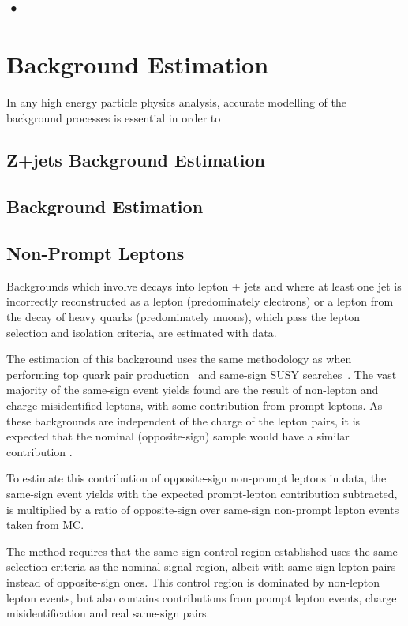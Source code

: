 \subsection{•}
\section{Background Estimation}\label{sec:bkgEst}
In any high energy particle physics analysis, accurate modelling of the background processes is essential in order to 
\subsection{Z+jets Background Estimation}\label{subsec:zPlusJets}

\subsection{\ttbar Background Estimation}\label{subsec:ttbar}

\subsection{Non-Prompt Leptons}\label{subsec:NPLs}
Backgrounds which involve decays into lepton + jets and where at least one jet is incorrectly reconstructed as a lepton (predominately electrons) or a lepton from the decay of heavy quarks (predominately muons), which pass the lepton selection and isolation criteria, are estimated with data.

The estimation of this background uses the same methodology as when performing top quark pair production~\cite{CMS:2016syx} and same-sign SUSY searches~\cite{CMS:2015vqc}.
The vast majority of the same-sign event yields found are the result of non-lepton and charge misidentified leptons, with some contribution from prompt leptons.
As these backgrounds are independent of the charge of the lepton pairs, it is expected that the nominal (opposite-sign) sample would have a similar contribution \cite{CMS:2015vqc}.

To estimate this contribution of opposite-sign non-prompt leptons in data, the same-sign event yields with the expected prompt-lepton contribution subtracted, is multiplied by a ratio of opposite-sign over same-sign non-prompt lepton events taken from MC.

The method requires that the same-sign control region established uses the same selection criteria as the nominal signal region, albeit with same-sign lepton pairs instead of opposite-sign ones.
This control region is dominated by non-lepton lepton events, but also contains contributions from prompt lepton events, charge misidentification and real same-sign pairs.

